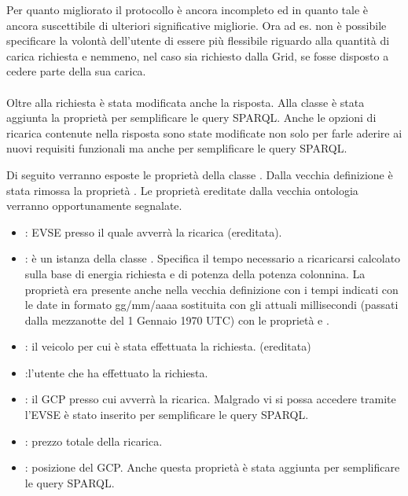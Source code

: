 \noindent
Per quanto migliorato il protocollo è ancora incompleto ed in quanto tale è ancora suscettibile di ulteriori significative migliorie. Ora ad es. non è possibile specificare la volontà dell'utente di essere più flessibile riguardo alla quantità di carica richiesta e nemmeno, nel caso sia richiesto dalla Grid, se fosse disposto a cedere parte della sua carica.
\\ \\
Oltre alla richiesta è stata modificata anche la risposta. Alla classe  è stata aggiunta la proprietà  per semplificare le query SPARQL. Anche le opzioni di ricarica contenute nella risposta sono state modificate non solo per farle aderire ai nuovi requisiti funzionali ma anche per semplificare le query SPARQL.

Di seguito verranno esposte le proprietà della classe . Dalla vecchia definizione è stata rimossa la proprietà . Le proprietà ereditate dalla vecchia ontologia verranno opportunamente segnalate.

\begin{itemize}
	\item {}: EVSE presso il quale avverrà la ricarica (ereditata).
	\item {}: è un istanza della classe . Specifica il tempo necessario a ricaricarsi calcolato sulla base di energia richiesta e di potenza della potenza colonnina. La proprietà era presente anche nella vecchia definizione con i tempi indicati con le date in formato gg/mm/aaaa sostituita con gli attuali millisecondi (passati dalla mezzanotte del 1 Gennaio 1970 UTC) con le proprietà  e .
	\item {}: il veicolo per cui è stata effettuata la richiesta. (ereditata)
	\item {}:l'utente che ha effettuato la richiesta.
	\item {}: il GCP presso cui avverrà la ricarica. Malgrado vi si possa accedere tramite l'EVSE è stato inserito per semplificare le query SPARQL.
	\item {}: prezzo totale della ricarica.
	\item {}: posizione del GCP. Anche questa proprietà è stata aggiunta per semplificare le query SPARQL.
\end{itemize}

